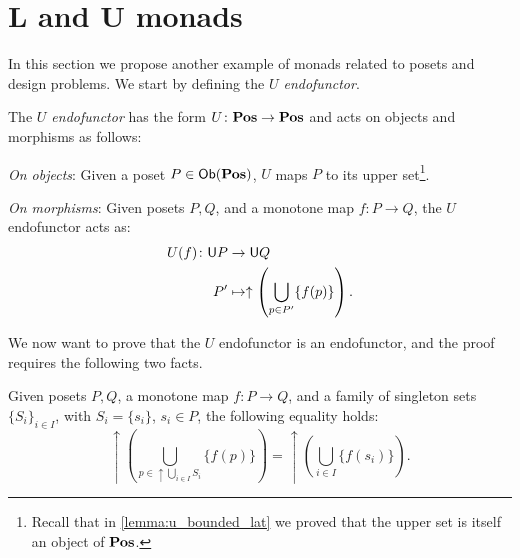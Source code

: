 \section{L and U monads}
In this section we propose another example of monads related to posets and design problems. We start by defining the \emph{$U$ endofunctor}.
\begin{definition}[$U$ endofunctor]
\label{def:ufunctor}
The \emph{$U$ endofunctor} has the form $U\colon \mathbf{Pos} \to \mathbf{Pos}$ and acts on objects and morphisms as follows:
\begin{compactenum}
    \item \emph{On objects}: Given a poset $P\in \operatorname{\mathsf{Ob}}(\mathbf{Pos})$, $U$ maps $P$ to its upper set\footnote{Recall that in \cref{lemma:u_bounded_lat} we proved that the upper set is itself an object of $\mathbf{Pos}$.}.
    \item \emph{On morphisms}: Given posets $P,Q$, and a monotone map $f\colon P\to Q$, the $U$ endofunctor acts as:
    \begin{equation}
        \begin{aligned}
            U(f)\colon \mathsf{U}P&\to \mathsf{U}Q\\
            P'&\mapsto \uparrow \left( \bigcup_{p\in P'} \{f(p)\}\right).
        \end{aligned}
    \end{equation}
\end{compactenum}
\end{definition}
We now want to prove that the $U$ endofunctor is an endofunctor, and the proof requires the following two facts.
\begin{lemma}
\label{lemma:unpack_u_functor}
Given posets $P,Q$, a monotone map $f\colon P \to Q$, and a family of singleton sets $\{S_i\}_{i\in I}$, with $S_i=\{s_i\}$, $s_i\in P$, the following equality holds:
\begin{equation}
\label{eq:lemma_unpack}
    \uparrow\left( \bigcup_{p\in \uparrow \bigcup_{i\in I}S_i}\{f(p)\}\right)= \uparrow \left( \bigcup_{i\in I} \{f(s_i)\}\right).
\end{equation}
\end{lemma}

